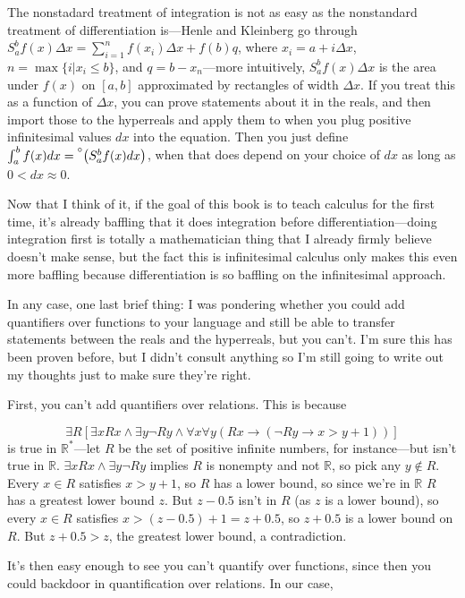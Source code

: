 \documentclass{article}
\newcommand{\st}[1]{\prescript{\circ}{}{#1}}
\begin{document}
The nonstadard treatment of integration is not as easy as the nonstandard treatment of differentiation is---Henle and Kleinberg go through $S_a^b f(x) \Delta x = \sum_{i=1}^n f(x_i)\Delta x + f(b)q$, where $x_i = a + i\Delta x$, $n = \max\{i | x_i \leq b\}$, and $q = b - x_n$---more intuitively, $S_a^b f(x) \Delta x$ is the area under $f(x)$ on $[a, b]$ approximated by rectangles of width $\Delta x$. If you treat this as a function of $\Delta x$, you can prove statements about it in the reals, and then import those to the hyperreals and apply them to when you plug positive infinitesimal values $dx$ into the equation. Then you just define $\int_a^b f(x) dx = \st{\left(S_a^b f(x)dx\right)}$, when that does depend on your choice of $dx$ as long as $0 < dx \approx 0$.

Now that I think of it, if the goal of this book is to teach calculus for the first time, it's already baffling that it does integration before differentiation---doing integration first is totally a mathematician thing that I already firmly believe doesn't make sense, but the fact this is infinitesimal calculus only makes this even more baffling because differentiation is so baffling on the infinitesimal approach.

In any case, one last brief thing: I was pondering whether you could add quantifiers over functions to your language and still be able to transfer statements between the reals and the hyperreals, but you can't. I'm sure this has been proven before, but I didn't consult anything so I'm still going to write out my thoughts just to make sure they're right.

First, you can't add quantifiers over relations. This is because 

\[\exists R [\exists x Rx \land \exists y \neg Ry \land \forall x \forall y (Rx \rightarrow (\neg Ry \rightarrow x > y + 1))]\]
is true in $\mathbb{R}^*$---let $R$ be the set of positive infinite numbers, for instance---but isn't true in $\mathbb{R}$. $\exists x Rx \land \exists y \neg Ry$ implies $R$ is nonempty and not $\mathbb{R}$, so pick any $y \notin R$. Every $x \in R$ satisfies $x > y + 1$, so $R$ has a lower bound, so since we're in $\mathbb{R}$ $R$ has a greatest lower bound $z$. But $z - 0.5$ isn't in $R$ (as $z$ is a lower bound), so every $x \in R$ satisfies $x > (z - 0.5) + 1 = z + 0.5$, so $z + 0.5$ is a lower bound on $R$. But $z + 0.5 > z$, the greatest lower bound, a contradiction.

It's then easy enough to see you can't quantify over functions, since then you could backdoor in quantification over relations. In our case,
\end{document}
